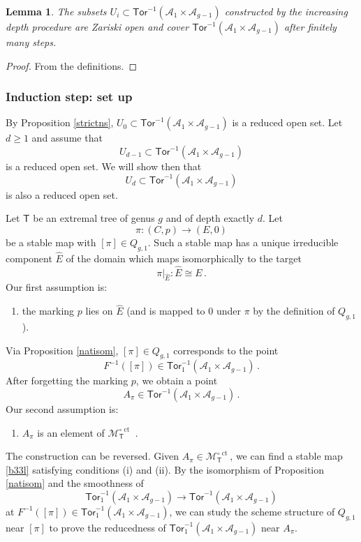 \documentclass[11pt]{amsart}
\newtheorem{lem}[thm]{Lemma}
\theoremstyle{definition}
\newcommand{\M}{\mathcal{M}}
\newcommand{\A}{\mathcal{A}}
\DeclareMathOperator{\ct}{ct}
\newcommand{\Tor}{\mathsf{Tor}}
\begin{document}
{\begin{lem}
The subsets $U_i \subset \Tor^{-1}(\A_1\times \A_{g-1})$
constructed by the increasing depth procedure are Zariski open 
and cover  $\Tor^{-1}(\A_1\times \A_{g-1})$ after finitely many steps.
\end{lem}

\begin{proof} From the definitions.
\end{proof}

\subsubsection{Induction step: set up} \label{indsetup}
By Proposition \ref{strictns}, $U_0
 \subset \Tor^{-1}(\A_1\times \A_{g-1})$ is 
a reduced open set. Let $d\geq 1$ and 
assume that $$U_{d-1} \subset \Tor^{-1}(\A_1\times \A_{g-1})$$ is 
a reduced open set.
We will show then that 
$$U_{d} \subset \Tor^{-1}(\A_1\times \A_{g-1})$$ is 
also a reduced open set.

Let $\mathsf{T}$ be an extremal tree of genus $g$ and of depth exactly $d$. Let 
\begin{equation}
\label{b33l}
\pi: (C,p) \rightarrow (E,0)
\end{equation}
be a stable map with $[\pi] \in Q_{g,1}$. Such a stable map has a unique irreducible component $\widehat{E}$ of the domain which maps isomorphically to the target
$$\pi|_{\widehat{E}}: \widehat{E} \cong
E\, .$$
Our first assumption is:
\begin{enumerate}
    \item[(i)] the marking $p$ lies on $\widehat{E}$ (and is
mapped to $0$ under $\pi$ by the definition of $Q_{g,1}$).
\end{enumerate}
Via Proposition \ref{natisom}, $[\pi]\in Q_{g,1}$ corresponds to the point 
$$F^{-1}([\pi]) \in \Tor^{-1}_1(\A_1\times \A_{g-1})\, . $$
After forgetting the
marking $p$, we obtain a point $$A_\pi \in \Tor^{-1}(\A_1\times \A_{g-1})\,.$$
Our second assumption is:
\begin{enumerate}
    \item[(ii)] $A_\pi$ is an element of  $\M_{\mathsf{T}}^{\circ\ct}$  .
\end{enumerate}

The construction can be reversed. Given $A_\pi \in \M_{\mathsf{T}}^{\circ\ct}$, we can find
a stable map \eqref{b33l} satisfying conditions (i) and (ii). By the
isomorphism of Proposition \ref{natisom} and 
the smoothness of
$$\Tor_1^{-1}(\A_1\times \A_{g-1}) \rightarrow \Tor^{-1}(\A_1\times \A_{g-1})$$
at $F^{-1}([\pi]) \in \Tor^{-1}_1(\A_1\times \A_{g-1})$,
we can study the scheme structure of $Q_{g,1}$ near $[\pi]$ to prove
the reducedness of $\Tor_1^{-1}(\A_1\times \A_{g-1})$ near $A_\pi$.

}
\end{document}
